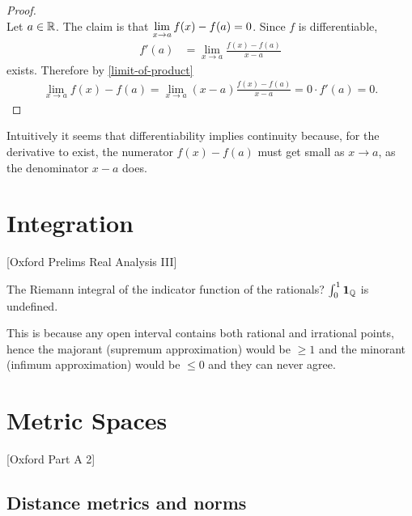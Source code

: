 \begin{proof}~\\
  Let $a \in \mathbb{R}$. The claim is that $\limxa f(x) - f(a) = 0$. Since $f$ is differentiable,
  \begin{align*}
    f'(a) &= \lim_{x \to a} \frac{f(x) - f(a)}{x - a}
  \end{align*}
  exists. Therefore by \eqref{limit-of-product}
  \begin{align*}
    \lim_{x \to a} f(x) - f(a) = \lim_{x \to a} (x - a)\frac{f(x) - f(a)}{x - a} = 0\cdot f'(a) = 0.
  \end{align*}
\end{proof}

\begin{remark*}
  Intuitively it seems that differentiability implies continuity because, for the derivative to
  exist, the numerator $f(x) - f(a)$ must get small as $x\to a$, as the denominator $x - a$ does.
\end{remark*}


\newpage
\section{Integration}
[Oxford Prelims Real Analysis III]

The Riemann integral of the indicator function of the rationals? $\int_0^1 {\bf 1}_{\mathbb{Q}}$ is undefined.

This is because any open interval contains both rational and irrational points, hence the majorant (supremum
approximation) would be $\geq 1$ and the minorant (infimum approximation) would be $\leq 0$ and they can never
agree.

\section{Metric Spaces}
[Oxford Part A 2]

\subsection{Distance metrics and norms}

